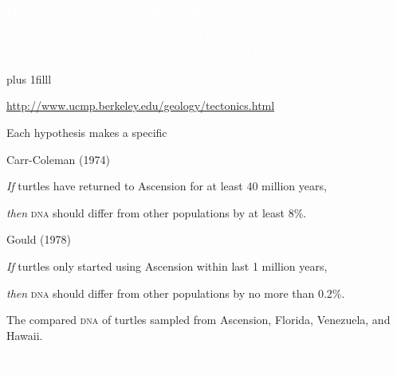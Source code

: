 \documentclass[t]{beamer}
\newcommand{\btVFill}{\vskip0pt plus 1filll}
\begin{document}
{
\begin{frame}[t]{\textcolor{white}{Plate tectonics causes continents to shift positions over time.}}
	\begin{center}
	\end{center}

	\textcolor{white}{As Ascension Island (red dot) separated from Brazil over millions of years, generations of turtles continued to visit the island to breed.}

	\btVFill

	\hfill\tiny \textcolor{white}{\url{http://www.ucmp.berkeley.edu/geology/tectonics.html}}

\end{frame}
}

\begin{frame}[t]{Each hypothesis makes a specific }
	\vspace*{-\baselineskip}


	\setlength{\columnseprule}{0.4pt}

	\begin{multicols}{2}
	
		\hangpara Carr-Coleman (1974)
	
		\hangpara \textit{If} turtles have returned to Ascension for at least 40 million years,
	
		\hangpara \textit{then} \textsc{dna} should differ from other populations by at least 8\%.
	
	\columnbreak
	
		\hangpara Gould (1978)
	
		\hangpara \textit{If} turtles only started using Ascension within last 1 million years,
	
		\hangpara \textit{then} \textsc{dna} should differ from other populations by no more than 0.2\%.	
	\end{multicols}
\end{frame}

{
\begin{frame}[b]{The  compared \textsc{dna} of turtles sampled from Ascension, Florida, Venezuela, and Hawaii.}

\tiny\textcolor{white}{University of Michigan School of Natural Resources \textsc{dna} Lab, Flickr, }
\end{frame}
}
\end{document}
